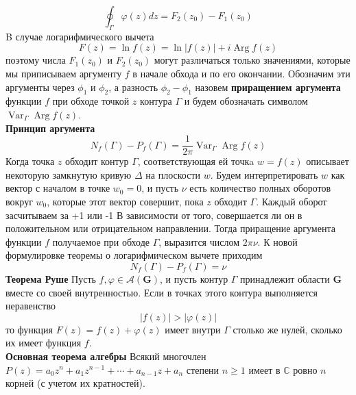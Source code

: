 \documentclass{article}
\begin{document}
	\begin{equation}
	\oint_{\Gamma} \varphi(z) d z=F_{2}\left(z_{0}\right)-F_{1}\left(z_{0}\right)
	\end{equation}
	B случае логарифмического вычета
	\begin{equation}
	F(z)=\ln f(z)=\ln |f(z)|+i \operatorname{Arg} f(z)
	\end{equation}
	поэтому числа $ F_{1}\left(z_{0}\right) $ и $ F_{2}\left(z_{0}\right) $ могут различаться только значениями, которые мы приписываем аргументу $ f $ в начале обхода и по его окончании. Обозначим эти аргументы через $ \phi_{1} $ и $ \phi_{2}$, а разность $ \phi_{2}-\phi_{1} $ назовем \textbf{приращением аргумента} функции $ f $ при обходе точкой $ z $ контура $ \Gamma $ и будем обозначать символом $\operatorname{Var}_{\Gamma} \operatorname{Arg} f(z)$.\\
	\textbf{Принцип аргумента}
	\begin{equation}
	N_{f}(\Gamma)-P_{f}(\Gamma)=\frac{1}{2 \pi}\operatorname{Var}_{\Gamma} \operatorname{Arg} f(z)
	\end{equation}
	Когда точка $z$ обходит контур $\Gamma$, соответствующая ей точкa $ w=f(z) $ описывает некоторую замкнутую кривую $ \Delta $ на плоскости $ w $. Будем интерпретировать $ w $ как вектор с началом в точке $ w_{0}=0$, и пусть $ \nu $ есть количество полных оборотов вокруг $ w_{0}$, которые этот вектор совершит, пока $z$ обходит $\Gamma$. Каждый оборот засчитываем за +1 или -1 В зависимости от того, совершается ли он в положительном или отрицательном направлении. Тогда приращение аргумента функции $ f $ получаемое при обходе $\Gamma$, выразится числом $2\pi\nu$. К новой формулировке теоремы о логарифмическом вычете приходим
	\begin{equation}
	N_{f}(\Gamma)-P_{f}(\Gamma)=\nu
	\end{equation}
	\textbf{Теорема Руше} Пусть $ f, \varphi \in \mathcal{A}(\mathbf{G})$, и пусть контур $\Gamma$ принадлежит области $\mathbf{G}$ вместе со своей внутренностью. Если в точках этого контура выполняется неравенство
	\begin{equation}
	|f(z)|>|\varphi(z)|
	\end{equation}
	то функция $ F(z)=f(z)+\varphi(z) $ имеет внутри $\Gamma$ столько же нулей, сколько их имеет функция $ f $.\\
	\textbf{Основная теорема алгебры} Всякий многочлен $P(z)=a_{0} z^{n}+a_{1} z^{n-1}+\cdots+a_{n-1} z+a_{n} $ степени $ n \geqslant 1 $ имеет в $ \mathbb{C} $ ровно $ n $ корней (с учетом их кратностей).\\ 
\end{document}
